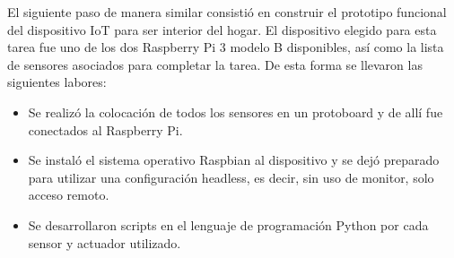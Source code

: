 El siguiente paso de manera similar consistió en construir el prototipo funcional del dispositivo IoT para ser interior del hogar. El dispositivo elegido para esta tarea fue uno de los dos Raspberry Pi 3 modelo B disponibles, así como la lista de sensores asociados para completar la tarea. De esta forma se llevaron las siguientes labores:
\begin{itemize}
\item Se realizó la colocación de todos los sensores en un protoboard y de allí fue conectados al Raspberry Pi.

\item Se instaló el sistema operativo Raspbian al dispositivo y se dejó preparado para utilizar una configuración headless, es decir, sin uso de monitor, solo acceso remoto.

\item Se desarrollaron scripts en el lenguaje de programación Python por cada sensor y actuador utilizado. 


\end{itemize}
